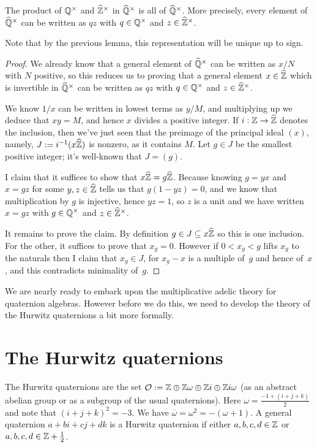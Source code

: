 \begin{lemma}
    \label{QHat.unitsrat_join_unitszHat}
    \leanok
    The product of $\mathbb{Q}^\times$ and $\widehat{\mathbb{Z}}^\times$ in $\widehat{\mathbb{Q}}^\times$ is all of $\widehat{\mathbb{Q}}^\times$.
    More precisely, every element of $\widehat{\mathbb{Q}}^\times$ can be written as $qz$ with $q\in\mathbb{Q}^\times$
    and $z\in\widehat{\mathbb{Z}}^\times$.
\end{lemma}
Note that by the previous lemma, this representation will be unique up to sign.
\begin{proof}
  We already know that a general element of $\widehat{\mathbb{Q}}^\times$ can be written as $x/N$ with $N$
  positive, so this reduces us to proving that a general element $x\in\widehat{\mathbb{Z}}$ which is invertible
  in $\widehat{\mathbb{Q}}^\times$ can be written as $qz$ with $q\in\mathbb{Q}^\times$ and $z\in\widehat{\mathbb{Z}}^\times$.

  We know $1/x$ can be written in lowest terms as $y/M$, and multiplying up we deduce
  that $xy=M$, and hence $x$ divides a positive integer. If $i:\mathbb{Z}\to\widehat{\mathbb{Z}}$ denotes
  the inclusion, then we've just seen that the preimage of the principal
  ideal $(x)$, namely, $J:=i^{-1}(x\widehat{\mathbb{Z}})$ is nonzero, as it contains $M$.
  Let $g\in J$ be the smallest positive integer; it's well-known that $J=(g)$.

  I claim that it suffices to show that $x\widehat{\mathbb{Z}}=g\widehat{\mathbb{Z}}$. Because knowing $g=yx$ and
  $x=gz$ for some $y,z\in\widehat{\mathbb{Z}}$ tells us that $g(1-yz)=0$, and we know that multiplication by $g$ is injective,
  hence $yz=1$, so $z$ is a unit and we have written $x=gz$ with $g\in\mathbb{Q}^\times$ and $z\in\widehat{\mathbb{Z}}^\times$.

  It remains to prove the claim. By definition $g\in J\subseteq x\widehat{\mathbb{Z}}$ so this is one
  inclusion. For the other, it suffices to prove that $x_g=0$. However if $0<x_g<g$
  lifts $x_g$ to the naturals then I claim that $x_g\in J$, for $x_g-x$ is a multiple
  of~$g$ and hence of~$x$, and this contradicts minimality of~$g$.
\end{proof}

We are nearly ready to embark upon the multiplicative adelic theory for quaternion algebras.
However before we do this, we need to develop the theory of the Hurwitz quaternions a bit
more formally.

\section{The Hurwitz quaternions}

\begin{definition}
    \label{Hurwitz}
    \leanok
        The Hurwitz quaternions are the set $\mathcal{O} := \mathbb{Z}\oplus\mathbb{Z} \omega\oplus\mathbb{Z} i\oplus
    \mathbb{Z} i\omega$ (as an abstract abelian group or as a subgroup of the usual quaternions).
    Here $\omega=\frac{-1+(i+j+k)}{2}$ and note that $(i+j+k)^2=-3$.
    We have $\overline{\omega}=\omega^2=-(\omega+1)$. A general quaternion
    $a+bi+cj+dk$ is a Hurwitz quaternion if either $a,b,c,d\in\mathbb{Z}$
    or $a,b,c,d\in\mathbb{Z}+\frac{1}{2}$.
\end{definition}

